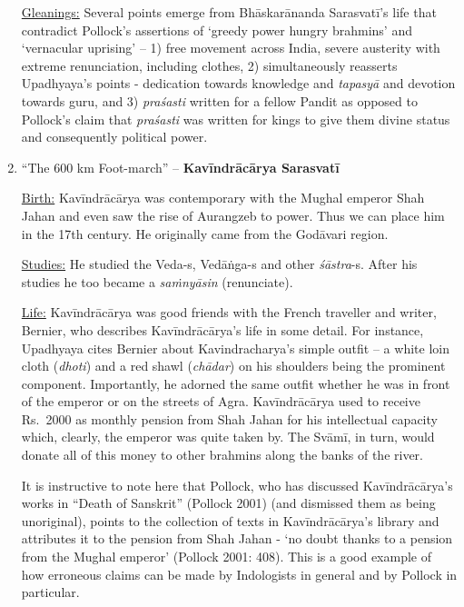 \begin{enumerate}
 \underline{Gleanings:} Several points emerge from Bhāskarānanda Saras\-vatī’s life that contradict Pollock’s assertions of ‘greedy power hungry brahmins’ and ‘vernacular uprising’ – 1) free movement across India, severe austerity with extreme renunciation, including clothes, 2) simultaneously reasserts Upadhyaya’s points - dedication towards knowledge and \textit{tapasyā} and devotion towards guru, and 3) \textit{praśasti} written for a fellow Pandit as opposed to Pollock’s claim that \textit{praśasti} was written for kings to give them divine status and consequently political power.


 \item 
 “The 600 km Foot-march” – \textbf{Kavīndrācārya Sarasvatī}

 \underline{Birth:} Kavīndrācārya was contemporary with the Mughal emperor Shah Jahan and even saw the rise of Aurangzeb to power. Thus we can place him in the 17th century. He originally came from the Godāvari region.

 \underline{Studies:} He studied the Veda-s, Vedāṅga-s and other \textit{śāstra}-s. After his studies he too became a \textit{saṁnyāsin} (renunciate).

 \underline{Life:} Kavīndrācārya was good friends with the French traveller and writer, Bernier, who describes Kavīndrācārya’s life in some detail. For instance, Upadhyaya cites Bernier about Kavindracharya’s simple outfit – a white loin cloth (\textit{dhoti}) and a red shawl (\textit{chādar}) on his shoulders being the prominent component. Importantly, he adorned the same outfit whether he was in front of the emperor or on the streets of Agra. Kavīndrācārya used to receive Rs.~2000 as monthly pension from Shah Jahan for his intellectual capacity which, clearly, the emperor was quite taken by. The Svāmī, in turn, would donate all of this money to other brahmins along the banks of the river.

 It is instructive to note here that Pollock, who has discussed Kavīndrācārya’s works in “Death of Sanskrit” (Pollock 2001) (and dismissed them as being unoriginal), points to the collection of texts in Kavīndrācārya’s library and attributes it to the pension from Shah Jahan - ‘no doubt thanks to a pension from the Mughal emperor’ (Pollock 2001: 408). This is a good example of how erroneous claims can be made by Indologists in general and by Pollock in particular.


\end{enumerate}
